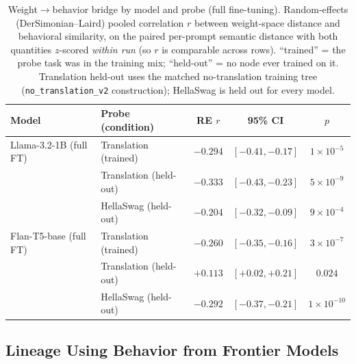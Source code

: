 \documentclass{article}
\theoremstyle{definition}
\theoremstyle{plain}
\begin{document}
\begin{table}[t]
\caption{Weight$\to$behavior bridge by model and probe (full fine-tuning). Random-effects
(DerSimonian--Laird) pooled correlation $r$ between weight-space distance and behavioral similarity,
on the paired per-prompt semantic distance with both quantities $z$-scored \emph{within run} (so $r$
is comparable across rows). ``trained'' = the probe task was in the training mix; ``held-out'' = no
node ever trained on it. Translation held-out uses the matched no-translation training tree
(\texttt{no\_translation\_v2} construction); HellaSwag is held out for every model.}
\label{tab:behavior_holdout}
\centering
\begin{tabular}{llccc}
\toprule
Model & Probe (condition) & RE $r$ & 95\% CI & $p$ \\
\midrule
Llama-3.2-1B (full FT) & Translation (trained)  & $-0.294$ & $[-0.41, -0.17]$ & $1\times10^{-5}$ \\
                       & Translation (held-out) & $-0.333$ & $[-0.43, -0.23]$ & $5\times10^{-9}$ \\
                       & HellaSwag (held-out)   & $-0.204$ & $[-0.32, -0.09]$ & $9\times10^{-4}$ \\
\midrule
Flan-T5-base (full FT) & Translation (trained)  & $-0.260$ & $[-0.35, -0.16]$ & $3\times10^{-7}$ \\
                       & Translation (held-out) & $+0.113$ & $[+0.02, +0.21]$ & $0.024$ \\
                       & HellaSwag (held-out)   & $-0.292$ & $[-0.37, -0.21]$ & $1\times10^{-10}$ \\
\bottomrule
\end{tabular}
\end{table}


\subsection{Lineage Using Behavior from Frontier Models}
\label{sec:results:blackbox}
\end{document}

